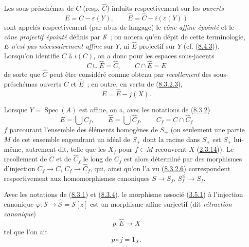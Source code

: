 \begin{env}[8.3.4]
\label{II.8.3.4-fr}
Les sous-préschémas de $C$ (resp. $\widehat{C}$) induits respectivement sur
les \emph{ouverts}
\begin{equation}
\label{II.8.3.4.1-fr}
  E=C-\varepsilon(Y),\qquad
  \widehat{E}=\widehat{C}-i(\varepsilon(Y))
\tag{8.3.4.1}
\end{equation}
sont appelés respectivement (par abus de langage) le \emph{cône affine
épointé} et le \emph{cône projectif épointé} définis par $\mathcal{S}$~; on
notera qu'en dépit de cette terminologie, $E$ \emph{n'est pas nécessairement
affine} sur $Y$, ni $\widehat{E}$ projectif sur $Y$
(cf. (\hyperref[II.8.4.3-fr]{8.4.3})). Lorsqu'on identifie $C$ à $i(C)$, on a
donc pour les espaces sous-jacents
\begin{equation}
\label{II.8.3.4.2-fr}
  C\cup\widehat{E}=\widehat{C},\qquad C\cap\widehat{E}=E
\tag{8.3.4.2}
\end{equation}
de sorte que $\widehat{C}$ peut être considéré comme obtenu par
\emph{recollement} des sous-préschémas ouverts $C$ et $\widehat{E}$~; en
outre, en vertu de (\hyperref[II.8.3.2.3-fr]{8.3.2.3}),
\begin{equation}
\label{II.8.3.4.3-fr}
  E=\widehat{E}-j(X).
\tag{8.3.4.3}
\end{equation}

Lorsque $Y=\operatorname{Spec}(A)$ est affine, on a, avec les notations de
(\hyperref[II.8.3.2-fr]{8.3.2})
\begin{equation}
\label{II.8.3.4.4-fr}
  E=\bigcup C_f,\qquad
  \widehat{E}=\bigcup\widehat{C}_f,\qquad
  C_f=C\cap\widehat{C}_f
\tag{8.3.4.4}
\end{equation}
$f$ parcourant l'ensemble des éléments homogènes de $S_+$ (ou seulement une
partie $M$ de cet ensemble engendrant un idéal de $S_+$ dont la racine dans
$S_+$ est $S_+$ lui-même, autrement dit, telle que les $X_f$ pour $f\in M$
recouvrent $X$ (\hyperref[II.2.3.14-fr]{2.3.14})). Le recollement de $C$ et de
$\widehat{C}_f$ le long de $C_f$ est alors déterminé par des morphismes
d'injection $C_f\to C$, $C_f\to\widehat{C}_f$, qui, ainsi qu'on l'a vu
(\hyperref[II.8.3.2.6-fr]{8.3.2.6}) correspondent respectivement aux
homomorphismes canoniques $S\to S_f$, $S_f^{\leq}\to S_f$.
\end{env}

\begin{proposition}[8.3.5]
\label{II.8.3.5-fr}
Avec les notations de (\hyperref[II.8.3.1-fr]{8.3.1}) et
(\hyperref[II.8.3.4-fr]{8.3.4}), le morphisme associé
(\hyperref[II.3.5.1-fr]{3.5.1}) à l'injection canonique
$\varphi:\mathcal{S}\to\widehat{\mathcal{S}}=\mathcal{S}[z]$ est un morphisme
affine surjectif (dit \emph{rétraction canonique})
\begin{equation}
\label{II.8.3.5.1-fr}
  p:\widehat{E}\to X
\tag{8.3.5.1}
\end{equation}
tel que l'on ait
\begin{equation}
\label{II.8.3.5.2-fr}
  p\circ j=1_X.
\tag{8.3.5.2}
\end{equation}
\end{proposition}

